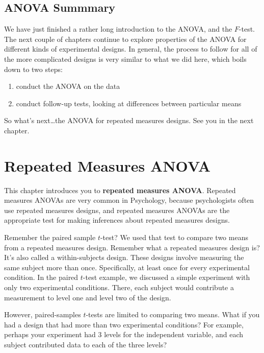 \documentclass[
]{book}
\providecommand{\tightlist}{%
  \setlength{\itemsep}{0pt}\setlength{\parskip}{0pt}}
\begin{document}
\hypertarget{anova-summmary}{%
\section{ANOVA Summmary}\label{anova-summmary}}

We have just finished a rather long introduction to the ANOVA, and the \(F\)-test. The next couple of chapters continue to explore properties of the ANOVA for different kinds of experimental designs. In general, the process to follow for all of the more complicated designs is very similar to what we did here, which boils down to two steps:

\begin{enumerate}
\def\labelenumi{\arabic{enumi})}
\tightlist
\item
  conduct the ANOVA on the data
\item
  conduct follow-up tests, looking at differences between particular means
\end{enumerate}

So what's next\ldots the ANOVA for repeated measures designs. See you in the next chapter.

\hypertarget{repeated-measures-anova}{%
\chapter{Repeated Measures ANOVA}\label{repeated-measures-anova}}

This chapter introduces you to \textbf{repeated measures ANOVA}. Repeated measures ANOVAs are very common in Psychology, because psychologists often use repeated measures designs, and repeated measures ANOVAs are the appropriate test for making inferences about repeated measures designs.

Remember the paired sample \(t\)-test? We used that test to compare two means from a repeated measures design. Remember what a repeated measures design is? It's also called a within-subjects design. These designs involve measuring the same subject more than once. Specifically, at least once for every experimental condition. In the paired \(t\)-test example, we discussed a simple experiment with only two experimental conditions. There, each subject would contribute a measurement to level one and level two of the design.

However, paired-samples \(t\)-tests are limited to comparing two means. What if you had a design that had more than two experimental conditions? For example, perhaps your experiment had 3 levels for the independent variable, and each subject contributed data to each of the three levels?
\end{document}
